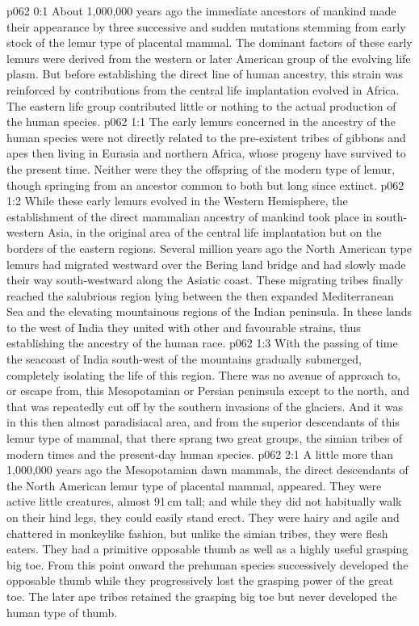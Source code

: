\author{Life Carrier}
\vs p062 0:1 About 1,000,000 years ago the immediate ancestors of mankind made their appearance by three successive and sudden mutations stemming from early stock of the lemur type of placental mammal. The dominant factors of these early lemurs were derived from the western or later American group of the evolving life plasm. But before establishing the direct line of human ancestry, this strain was reinforced by contributions from the central life implantation evolved in Africa. The eastern life group contributed little or nothing to the actual production of the human species.
\vs p062 1:1 The early lemurs concerned in the ancestry of the human species were not directly related to the pre\hyp{}existent tribes of gibbons and apes then living in Eurasia and northern Africa, whose progeny have survived to the present time. Neither were they the offspring of the modern type of lemur, though springing from an ancestor common to both but long since extinct.
\vs p062 1:2 While these early lemurs evolved in the Western Hemisphere, the establishment of the direct mammalian ancestry of mankind took place in south\hyp{}western Asia, in the original area of the central life implantation but on the borders of the eastern regions. Several million years ago the North American type lemurs had migrated westward over the Bering land bridge and had slowly made their way south\hyp{}westward along the Asiatic coast. These migrating tribes finally reached the salubrious region lying between the then expanded Mediterranean Sea and the elevating mountainous regions of the Indian peninsula. In these lands to the west of India they united with other and favourable strains, thus establishing the ancestry of the human race.
\vs p062 1:3 With the passing of time the seacoast of India south\hyp{}west of the mountains gradually submerged, completely isolating the life of this region. There was no avenue of approach to, or escape from, this Mesopotamian or Persian peninsula except to the north, and that was repeatedly cut off by the southern invasions of the glaciers. And it was in this then almost paradisiacal area, and from the superior descendants of this lemur type of mammal, that there sprang two great groups, the simian tribes of modern times and the present\hyp{}day human species.
\vs p062 2:1 A little more than 1,000,000 years ago the Mesopotamian dawn mammals, the direct descendants of the North American lemur type of placental mammal,  appeared. They were active little creatures, almost 91\,cm tall; and while they did not habitually walk on their hind legs, they could easily stand erect. They were hairy and agile and chattered in monkeylike fashion, but unlike the simian tribes, they were flesh eaters. They had a primitive opposable thumb as well as a highly useful grasping big toe. From this point onward the prehuman species successively developed the opposable thumb while they progressively lost the grasping power of the great toe. The later ape tribes retained the grasping big toe but never developed the human type of thumb.
